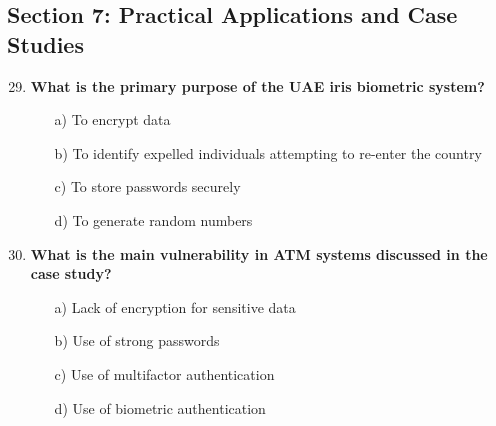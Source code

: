 \documentclass{article}
\begin{document}
\subsection*{Section 7: Practical Applications and Case Studies}
\begin{enumerate}
    \setcounter{enumi}{28}
    \item \textbf{What is the primary purpose of the UAE iris biometric system?}
    \begin{itemize}
        \item[a)] To encrypt data  
        \item[b)] To identify expelled individuals attempting to re-enter the country  
        \item[c)] To store passwords securely  
        \item[d)] To generate random numbers  
    \end{itemize}

    \item \textbf{What is the main vulnerability in ATM systems discussed in the case study?}
    \begin{itemize}
        \item[a)] Lack of encryption for sensitive data  
        \item[b)] Use of strong passwords  
        \item[c)] Use of multifactor authentication  
        \item[d)] Use of biometric authentication  
    \end{itemize}
\end{enumerate}
\newpage
\end{document}
